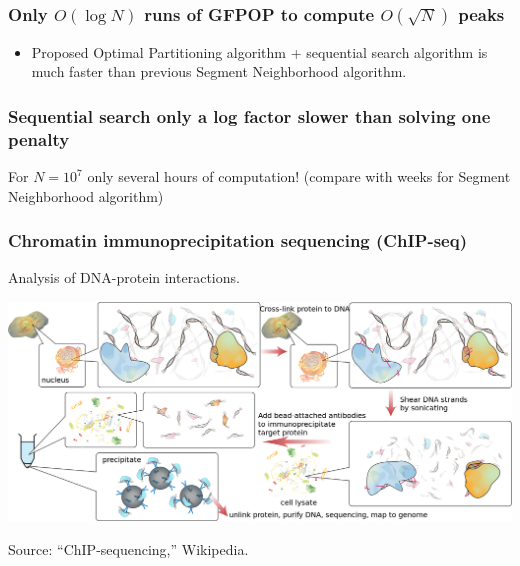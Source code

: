 \documentclass[t]{beamer}
\begin{document}
\begin{frame}
  \frametitle{Only $O(\log N)$ runs of GFPOP to compute $O(\sqrt N)$
    peaks}
  

  \begin{itemize}
  \item Proposed Optimal Partitioning algorithm + sequential search
    algorithm is much faster than previous Segment
    Neighborhood algorithm. 
  \end{itemize}
  
\end{frame}

\begin{frame}
  \frametitle{Sequential search only a log factor slower than solving one penalty}
   

  For $N=10^7$ only several hours of computation! (compare with weeks
  for Segment Neighborhood algorithm)
  
\end{frame}

\begin{frame}
  \frametitle{Chromatin immunoprecipitation sequencing (ChIP-seq)}
  Analysis of DNA-protein interactions.

  \includegraphics[width=\textwidth]{Chromatin_immunoprecipitation_sequencing_wide.png}

  Source: ``ChIP-sequencing,'' Wikipedia.
\end{frame}
\end{document}
